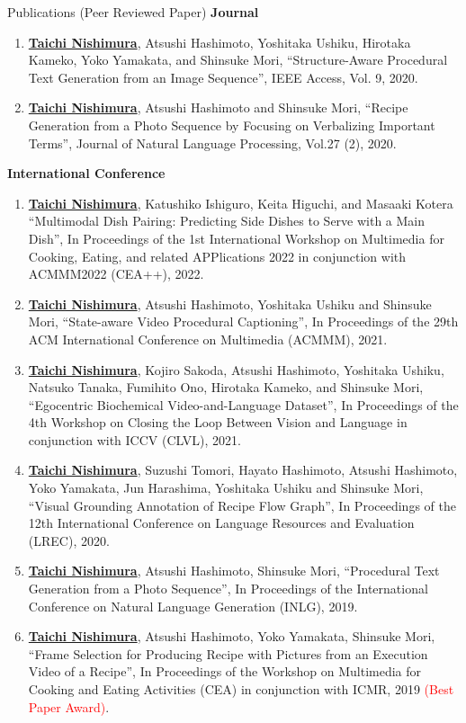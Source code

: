 \begin{rSection}{Publications (Peer Reviewed Paper)} 
{\bf Journal}
\vspace{-0.15cm}
\begin{enumerate}
    \item \underline{{\bf Taichi Nishimura}}, Atsushi Hashimoto, Yoshitaka Ushiku, Hirotaka Kameko, Yoko Yamakata, and Shinsuke Mori, ``Structure-Aware Procedural Text Generation from an Image Sequence'', IEEE Access, Vol. 9, 2020.
    \item \underline{{\bf Taichi Nishimura}}, Atsushi Hashimoto and Shinsuke Mori, ``Recipe Generation from a Photo Sequence by Focusing on Verbalizing Important Terms'', Journal of Natural Language Processing, Vol.27 (2), 2020.
\end{enumerate}

{\bf International Conference}
\vspace{-0.15cm}
\begin{enumerate}
    \item \underline{{\bf Taichi Nishimura}}, Katushiko Ishiguro, Keita Higuchi, and Masaaki Kotera ``Multimodal Dish Pairing: Predicting Side Dishes to Serve with a Main Dish'', In Proceedings of the 1st International Workshop on Multimedia for Cooking, Eating, and related APPlications 2022 in conjunction with ACMMM2022 (CEA++), 2022.
    \item \underline{{\bf Taichi Nishimura}}, Atsushi Hashimoto, Yoshitaka Ushiku and Shinsuke Mori, ``State-aware Video Procedural Captioning'', In Proceedings of the 29th ACM International Conference on Multimedia (ACMMM), 2021.
    \item \underline{{\bf Taichi Nishimura}}, Kojiro Sakoda, Atsushi Hashimoto, Yoshitaka Ushiku, Natsuko Tanaka, Fumihito Ono, Hirotaka Kameko, and Shinsuke Mori, ``Egocentric Biochemical Video-and-Language Dataset'', In Proceedings of the 4th Workshop on Closing the Loop Between Vision and Language in conjunction with ICCV (CLVL), 2021.
    \item \underline{{\bf Taichi Nishimura}}, Suzushi Tomori, Hayato Hashimoto, Atsushi Hashimoto, Yoko Yamakata, Jun Harashima, Yoshitaka Ushiku and Shinsuke Mori, ``Visual Grounding Annotation of Recipe Flow Graph'', In Proceedings of the 12th International Conference on Language Resources and Evaluation (LREC), 2020.
    \item \underline{{\bf Taichi Nishimura}}, Atsushi Hashimoto, Shinsuke Mori, ``Procedural Text Generation from a Photo Sequence'', In Proceedings of 
the International Conference on Natural Language Generation (INLG), 2019.
    \item \underline{{\bf Taichi Nishimura}}, Atsushi Hashimoto, Yoko Yamakata, Shinsuke Mori, ``Frame Selection for Producing Recipe with Pictures from an Execution Video of a Recipe'', In Proceedings of the Workshop on Multimedia for Cooking and Eating Activities (CEA) in conjunction with ICMR, 2019 \textcolor{red}{(Best Paper Award)}.
\end{enumerate}


\end{rSection}
